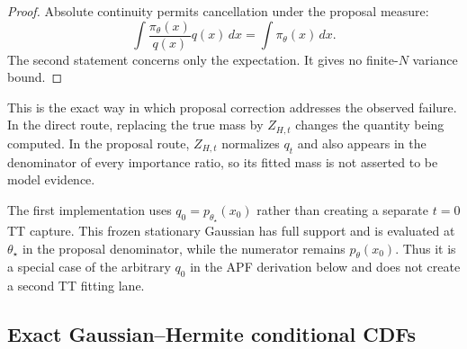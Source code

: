 \documentclass[11pt]{article}
\begin{document}
\begin{proof}
Absolute continuity permits cancellation under the proposal measure:
\[
\int \frac{\pi_\theta(x)}{q(x)}q(x)\,dx
=\int\pi_\theta(x)\,dx.
\]
The second statement concerns only the expectation. It gives no finite-$N$
variance bound.
\end{proof}

This is the exact way in which proposal correction addresses the observed
failure. In the direct route, replacing the true mass by $Z_{H,t}$ changes the
quantity being computed. In the proposal route, $Z_{H,t}$ normalizes $q_t$ and
also appears in the denominator of every importance ratio, so its fitted mass
is not asserted to be model evidence.

The first implementation uses
$q_0=p_{\theta_\star}(x_0)$ rather than creating a separate $t=0$ TT capture.
This frozen stationary Gaussian has full support and is evaluated at
$\theta_\star$ in the proposal denominator, while the numerator remains
$p_\theta(x_0)$. Thus it is a special case of the arbitrary $q_0$ in the APF
derivation below and does not create a second TT fitting lane.

\subsection{Exact Gaussian--Hermite conditional CDFs}
\end{document}
